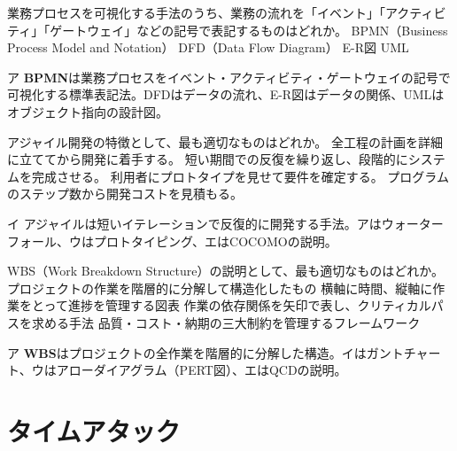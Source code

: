 
\begin{itpmon}{%
業務プロセスを可視化する手法のうち、業務の流れを「イベント」「アクティビティ」「ゲートウェイ」などの記号で表記するものはどれか。}
\sentakushi
  {BPMN（Business Process Model and Notation）}
  {DFD（Data Flow Diagram）}
  {E-R図}
  {UML}
\end{itpmon}
\begin{kaisetsu}{ア}
\textbf{BPMN}は業務プロセスをイベント・アクティビティ・ゲートウェイの記号で可視化する標準表記法。DFDはデータの流れ、E-R図はデータの関係、UMLはオブジェクト指向の設計図。
\end{kaisetsu}

\begin{itpmon}{%
アジャイル開発の特徴として、最も適切なものはどれか。}
\sentakushi
  {全工程の計画を詳細に立ててから開発に着手する。}
  {短い期間での反復を繰り返し、段階的にシステムを完成させる。}
  {利用者にプロトタイプを見せて要件を確定する。}
  {プログラムのステップ数から開発コストを見積もる。}
\end{itpmon}
\begin{kaisetsu}{イ}
アジャイルは短いイテレーションで反復的に開発する手法。アはウォーターフォール、ウはプロトタイピング、エはCOCOMOの説明。
\end{kaisetsu}

\begin{itpmon}{%
WBS（Work Breakdown Structure）の説明として、最も適切なものはどれか。}
\sentakushi
  {プロジェクトの作業を階層的に分解して構造化したもの}
  {横軸に時間、縦軸に作業をとって進捗を管理する図表}
  {作業の依存関係を矢印で表し、クリティカルパスを求める手法}
  {品質・コスト・納期の三大制約を管理するフレームワーク}
\end{itpmon}
\begin{kaisetsu}{ア}
\textbf{WBS}はプロジェクトの全作業を階層的に分解した構造。イはガントチャート、ウはアローダイアグラム（PERT図）、エはQCDの説明。
\end{kaisetsu}

\section{タイムアタック}

